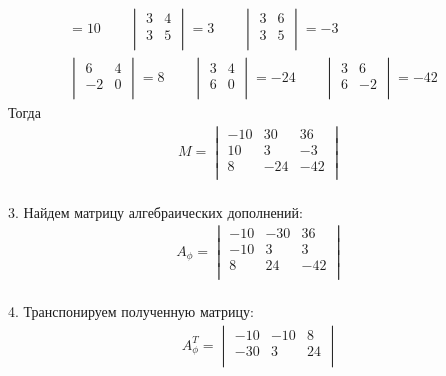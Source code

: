 \begin{enumerate}
\begin{gather*}
				= 10\qquad
				\begin{vmatrix}
					3 & 4\\
					3 & 5\\
				\end{vmatrix}
				= 3\qquad
				\begin{vmatrix}
					3 & 6\\
					3 & 5\\
				\end{vmatrix}
				= -3\qquad
				\\
				\begin{vmatrix}
					6 & 4\\
					-2 & 0\\
				\end{vmatrix}
				= 8\qquad
				\begin{vmatrix}
					3 & 4\\
					6 & 0\\
				\end{vmatrix}
				= -24\qquad
				\begin{vmatrix}
					3 & 6\\
					6 & -2\\
				\end{vmatrix}
				= -42\quad
			\end{gather*}
			Тогда 
			\begin{gather*}
				M = 
				\begin{vmatrix}
					-10 & 30 & 36\\
					10 & 3 & -3\\
					8 & -24 & -42\\
				\end{vmatrix}
			\end{gather*}
			\\
			3. Найдем матрицу алгебраических дополнений: 
			\begin{gather*}		
				A_{\phi} =
				\begin{vmatrix}
					-10 & -30 & 36\\
					-10 & 3 & 3\\
					8 & 24 & -42\\
				\end{vmatrix} 
			\end{gather*}
			\\
			4. Транспонируем полученную матрицу: 
			\begin{gather*}
				A_{\phi}^{T} =
				\begin{vmatrix}
					-10 & -10 & 8\\
					-30 & 3 & 24\\

\end{vmatrix}
\end{gather*}
\end{enumerate}
